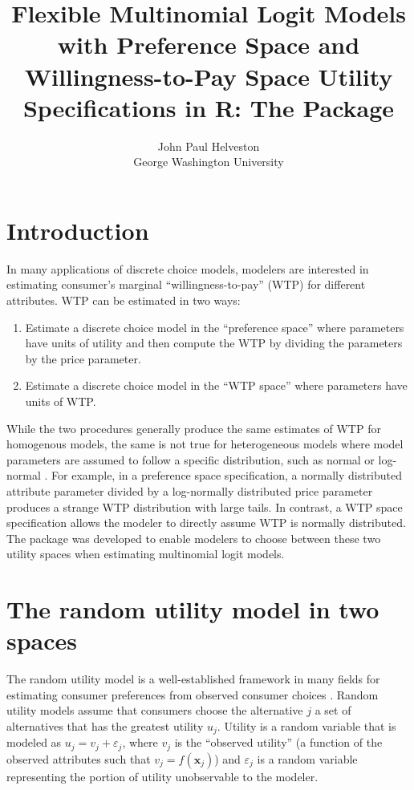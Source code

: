 \documentclass[article]{jss}
\author{
John Paul Helveston\\George Washington University
}
\title{Flexible Multinomial Logit Models with Preference Space and
Willingness-to-Pay Space Utility Specifications in R: The \pkg{logitr}
Package}
\providecommand{\tightlist}{%
  \setlength{\itemsep}{0pt}\setlength{\parskip}{0pt}}
\begin{document}
\newcommand{\betaVec}{\boldsymbol\upbeta}
\newcommand{\omegaVec}{\boldsymbol\upomega}
\newcommand{\zetaVec}{\boldsymbol\upzeta}
\newcommand{\deltaVec}{\boldsymbol\updelta}
\newcommand{\gammaVec}{\boldsymbol\upgamma}
\newcommand{\epsilonVec}{\boldsymbol\upepsilon}
\newcommand{\xVec}{\mathrm{\mathbf{x}}}
\newcommand{\XVec}{\mathrm{\mathbf{X}}}

\hypertarget{introduction}{%
\section{Introduction}\label{introduction}}

In many applications of discrete choice models, modelers are interested
in estimating consumer's marginal ``willingness-to-pay'' (WTP) for
different attributes. WTP can be estimated in two ways:

\begin{enumerate}
\def\labelenumi{\arabic{enumi}.}
\tightlist
\item
  Estimate a discrete choice model in the ``preference space'' where
  parameters have units of utility and then compute the WTP by dividing
  the parameters by the price parameter.
\item
  Estimate a discrete choice model in the ``WTP space'' where parameters
  have units of WTP.
\end{enumerate}

While the two procedures generally produce the same estimates of WTP for
homogenous models, the same is not true for heterogeneous models where
model parameters are assumed to follow a specific distribution, such as
normal or log-normal \citep{Train2005}. For example, in a preference
space specification, a normally distributed attribute parameter divided
by a log-normally distributed price parameter produces a strange WTP
distribution with large tails. In contrast, a WTP space specification
allows the modeler to directly assume WTP is normally distributed. The
 package was developed to enable modelers to choose between
these two utility spaces when estimating multinomial logit models.

\hypertarget{the-random-utility-model-in-two-spaces}{%
\section{The random utility model in two
spaces}\label{the-random-utility-model-in-two-spaces}}

The random utility model is a well-established framework in many fields
for estimating consumer preferences from observed consumer choices
\citep[\citet{Train2009}]{Louviere2000}. Random utility models assume
that consumers choose the alternative \(j\) a set of alternatives that
has the greatest utility \(u_{j}\). Utility is a random variable that is
modeled as \(u_{j} = v_{j} + \varepsilon_{j}\), where \(v_{j}\) is the
``observed utility'' (a function of the observed attributes such that
\(v_{j} = f(\mathrm{\mathbf{x}}_{j})\)) and \(\varepsilon_{j}\) is a
random variable representing the portion of utility unobservable to the
modeler.
\end{document}
